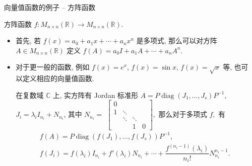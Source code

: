 \graymode
\begin{frame}{向量值函数的例子 -- 方阵函数}

方阵函数 $f: M_{n\times n}(\mathbb{R}) \to M_{n\times n}(\mathbb{R}).$

\pause
\vspace{0.6em}

\begin{itemize}
\item 首先, 若 $f(x) = a_0 + a_1 x + \cdots + a_n x^n$ 是多项式, 那么可以对方阵 $A \in M_{n\times n}(\mathbb{R})$ 定义 $f(A) = a_0 I + a_1 A + \cdots + a_n A^n.$
\pause
\vspace{0.6em}
\item 对于更一般的函数, 例如 $f(x) = e^x$, $f(x) = \sin x$, $f(x) = \sqrt{x}$ 等, 也可以定义相应的向量值函数.

\pause

在复数域 $\mathbb{C}$ 上, 实方阵有 Jordan 标准形 $A = P\operatorname{diag}(J_1, \dots, J_s)P^{-1},$ $J_i = \lambda_i I_{n_i} + N_{n_i}$, 其中 $N_{n_i} =$
$\left[\begin{smallmatrix}
0 & & & \\
1 & \ddots & & \\
& \ddots & \ddots & \\
& & 1 & 0
\end{smallmatrix}\right],$
那么对于多项式 $f,$ 有
\begin{gather*}
f(A) = P\operatorname{diag}(f(J_1), \dots, f(J_s))P^{-1}, \\
f(J_i) = f(\lambda_i) I_{n_i} + f'(\lambda_i) N_{n_i} + \cdots + \dfrac{f^{(n_i-1)}(\lambda_i)}{n_i!} N_{n_i}^{n_i-1}.
\end{gather*}
\end{itemize}

\end{frame}


